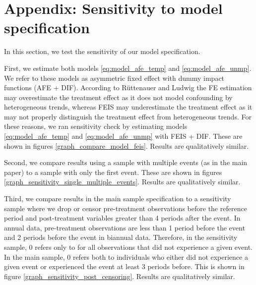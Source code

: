 \clearpage
\section{Appendix: Sensitivity to model specification}\label{appendix:sensitivity_model}
\setcounter{table}{0}
\setcounter{figure}{0}
\renewcommand*\thetable{\Alph{section}.\arabic{table}}
\renewcommand*\thefigure{\Alph{section}.\arabic{figure}}
\renewcommand{\theHfigure}{\Alph{section}.\arabic{table}}
\renewcommand{\theHtable}{\Alph{section}.\arabic{figure}}

In this section, we test the sensitivity of our model specification.  

First, we estimate both models \ref{eq:model_afe_temp} and \ref{eq:model_afe_unmp}.  We refer to these models as asymmetric fixed effect with dummy impact functions (AFE + DIF).  According to Rüttenauer and Ludwig \citeyearpar{ruttenauer_fixed_2020} the FE estimation may overestimate the treatment effect as it does not model confounding by heterogeneous trends, whereas FEIS may underestimate the treatment effect as it may not properly distinguish the treatment effect from heterogeneous trends. For these reasons, we ran sensitivity check by estimating models \ref{eq:model_afe_temp} and \ref{eq:model_afe_unmp} with FEIS + DIF.  These are shown in figures \ref{graph_compare_model_feis}.  Results are qualitatively similar.

Second, we compare results using a sample with multiple events (as in the main paper) to a sample with only the first event.  These are shown in figures \ref{graph_sensitivity_single_multiple_events}.  Results are qualitatively similar.

Third, we compare results in the main sample specification to a sensitivity sample where we drop or censor pre-treatment observations before the reference period and post-treatment variables greater than 4 periods after the event.  In annual data, pre-treatment observations are less than 1 period before the event and 2 periods before the event in biannual data.  Therefore, in the sensitivity sample, 0 refers only to for all observations that did not experience a given event.  In the main sample, 0 refers both to individuals who either did not experience a given event or experienced the event at least 3 periods before.  This is shown in figure \ref{graph_sensitivity_post_censoring}.  Results are qualitatively similar.

